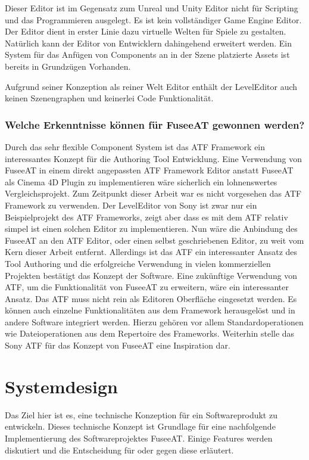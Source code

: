 \documentclass[pagesize, paper=a4, fontsize=12pt, titlepage=true, headings=small, headnosepline, abstractoff, liststotoc, nochapterprefix, plainheadsepline, twoside]{scrreprt}
\begin{document}
Dieser Editor ist im Gegensatz zum Unreal und Unity Editor nicht für Scripting und das Programmieren ausgelegt. Es ist kein vollständiger Game Engine Editor. Der Editor dient in erster Linie dazu virtuelle Welten für Spiele zu gestalten. Natürlich kann der Editor von Entwicklern dahingehend erweitert werden. Ein System für das Anfügen von Components an in der Szene platzierte Assets ist bereits in Grundzügen Vorhanden.

Aufgrund seiner Konzeption als reiner Welt Editor enthält der LevelEditor auch keinen Szenengraphen und keinerlei Code Funktionalität.

\subsubsection{Welche Erkenntnisse können für FuseeAT gewonnen werden?}
Durch das sehr flexible Component System ist das ATF Framework ein interessantes Konzept für die Authoring Tool Entwicklung. Eine Verwendung von FuseeAT in einem direkt angepassten ATF Framework Editor anstatt FuseeAT als Cinema 4D Plugin zu implementieren wäre sicherlich ein lohnenswertes Vergleichsprojekt. Zum Zeitpunkt dieser Arbeit war es nicht vorgesehen das ATF Framework zu verwenden. Der LevelEditor von Sony ist zwar nur ein Beispielprojekt des ATF Frameworks, zeigt aber dass es mit dem ATF relativ simpel ist einen solchen Editor zu implementieren. Nun wäre die Anbindung des FuseeAT an den ATF Editor, oder einen selbst geschriebenen Editor,  zu weit vom Kern dieser Arbeit entfernt. Allerdings ist das ATF ein interessanter Ansatz des Tool Authoring und die erfolgreiche Verwendung in vielen kommerziellen Projekten bestätigt das Konzept der Software. Eine zukünftige Verwendung von ATF, um die Funktionalität von FuseeAT zu erweitern, wäre ein interessanter Ansatz. Das ATF muss nicht rein als Editoren Oberfläche eingesetzt werden. Es können auch einzelne Funktionalitäten aus dem Framework herausgelöst und in andere Software integriert werden. Hierzu gehören vor allem Standardoperationen wie Dateioperationen aus dem Repertoire des Frameworks. Weiterhin stelle das Sony ATF für das Konzept von FuseeAT eine Inspiration dar.

\section{Systemdesign}
Das Ziel hier ist es, eine technische Konzeption für ein Softwareprodukt zu entwickeln. Dieses technische Konzept ist Grundlage für eine nachfolgende Implementierung des Softwareprojektes FuseeAT. Einige Features werden diskutiert und die Entscheidung für oder gegen diese erläutert.
\end{document}
